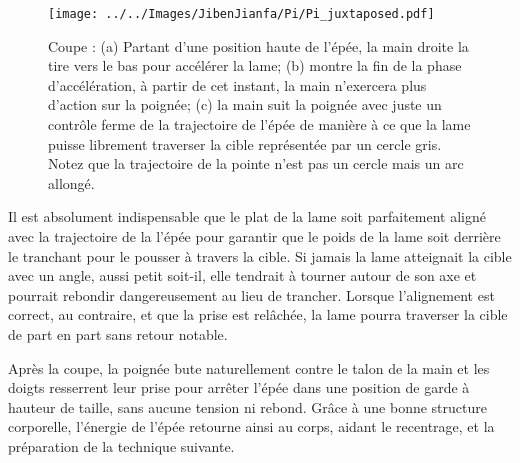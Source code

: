\begin{figure}[ht]
\centering
	\texttt{[image: ../../Images/JibenJianfa/Pi/Pi\_juxtaposed.pdf]}
	\caption[Coupe \Pi{}]{Coupe \Pi{} : (a) Partant d'une position haute de l'épée, la main droite la tire vers le bas pour accélérer la lame; (b) montre la fin de la phase d'accélération, à partir de cet instant, la main n'exercera plus d'action sur la poignée; (c) la main suit la poignée avec juste un contrôle ferme de la trajectoire de l'épée de manière à ce que la lame puisse librement traverser la cible représentée par un cercle gris. Notez que la trajectoire de la pointe n'est pas un cercle mais un arc allongé.}
	\label{fig:pi_cut}
\end{figure}

Il est absolument indispensable que le plat de la lame soit parfaitement aligné avec la trajectoire de la l'épée pour garantir que le poids de la lame soit derrière le tranchant pour le pousser à travers la cible. Si jamais la lame atteignait la cible avec un angle, aussi petit soit-il, elle tendrait à tourner autour de son axe et pourrait rebondir dangereusement au lieu de trancher. Lorsque l'alignement est correct, au contraire, et que la prise est relâchée, la lame pourra traverser la cible de part en part sans retour notable.

Après la coupe, la poignée bute naturellement contre le talon de la main et les doigts resserrent leur prise pour arrêter l'épée dans une position de garde à hauteur de taille, sans aucune tension ni rebond. Grâce à une bonne structure corporelle, l'énergie de l'épée retourne ainsi au corps, aidant le recentrage, et la préparation de la technique suivante.